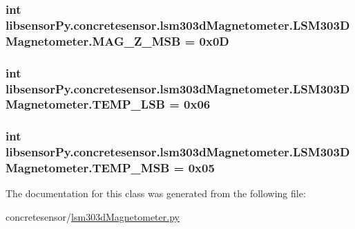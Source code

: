 \subsubsection[{M\+A\+G\+\_\+\+Z\+\_\+\+M\+S\+B}]{\setlength{\rightskip}{0pt plus 5cm}int libsensor\+Py.\+concretesensor.\+lsm303d\+Magnetometer.\+L\+S\+M303\+D\+Magnetometer.\+M\+A\+G\+\_\+\+Z\+\_\+\+M\+S\+B = 0x0\+D\hspace{0.3cm}{\ttfamily [static]}}\label{classlibsensorPy_1_1concretesensor_1_1lsm303dMagnetometer_1_1LSM303DMagnetometer_a19cfb1c31320f15b8c7c5cb963bb3403}
\hypertarget{classlibsensorPy_1_1concretesensor_1_1lsm303dMagnetometer_1_1LSM303DMagnetometer_a549e09c1f7fbdb4f137523c3a3441344}{}
\subsubsection[{T\+E\+M\+P\+\_\+\+L\+S\+B}]{\setlength{\rightskip}{0pt plus 5cm}int libsensor\+Py.\+concretesensor.\+lsm303d\+Magnetometer.\+L\+S\+M303\+D\+Magnetometer.\+T\+E\+M\+P\+\_\+\+L\+S\+B = 0x06\hspace{0.3cm}{\ttfamily [static]}}\label{classlibsensorPy_1_1concretesensor_1_1lsm303dMagnetometer_1_1LSM303DMagnetometer_a549e09c1f7fbdb4f137523c3a3441344}
\hypertarget{classlibsensorPy_1_1concretesensor_1_1lsm303dMagnetometer_1_1LSM303DMagnetometer_a0efd25a25e60ac471bdac2977f25a870}{}
\subsubsection[{T\+E\+M\+P\+\_\+\+M\+S\+B}]{\setlength{\rightskip}{0pt plus 5cm}int libsensor\+Py.\+concretesensor.\+lsm303d\+Magnetometer.\+L\+S\+M303\+D\+Magnetometer.\+T\+E\+M\+P\+\_\+\+M\+S\+B = 0x05\hspace{0.3cm}{\ttfamily [static]}}\label{classlibsensorPy_1_1concretesensor_1_1lsm303dMagnetometer_1_1LSM303DMagnetometer_a0efd25a25e60ac471bdac2977f25a870}


The documentation for this class was generated from the following file\+:\begin{DoxyCompactItemize}
\item 
concretesensor/\hyperlink{concretesensor_2lsm303dMagnetometer_8py}{lsm303d\+Magnetometer.\+py}\end{DoxyCompactItemize}
